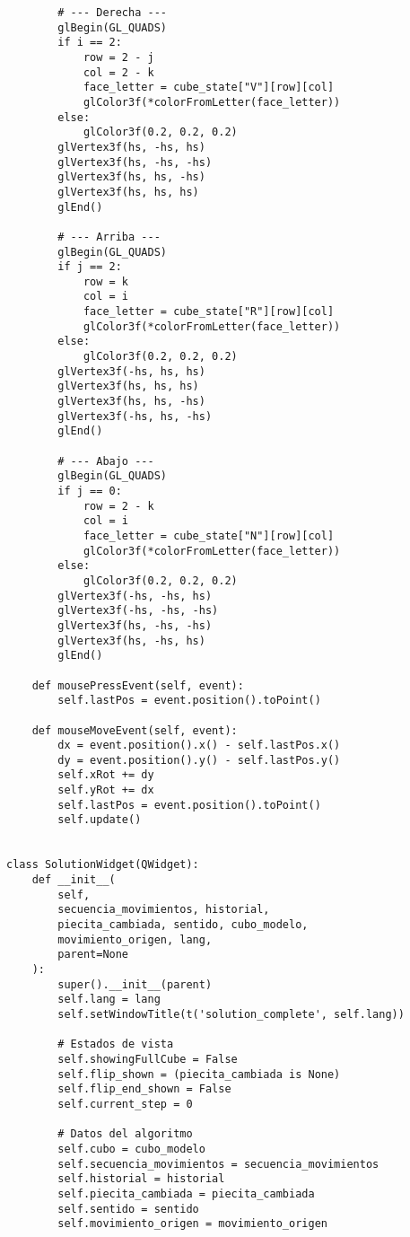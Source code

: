 \begin{lstlisting}
        # --- Derecha ---
        glBegin(GL_QUADS)
        if i == 2:
            row = 2 - j
            col = 2 - k
            face_letter = cube_state["V"][row][col]
            glColor3f(*colorFromLetter(face_letter))
        else:
            glColor3f(0.2, 0.2, 0.2)
        glVertex3f(hs, -hs, hs)
        glVertex3f(hs, -hs, -hs)
        glVertex3f(hs, hs, -hs)
        glVertex3f(hs, hs, hs)
        glEnd()

        # --- Arriba ---
        glBegin(GL_QUADS)
        if j == 2:
            row = k
            col = i
            face_letter = cube_state["R"][row][col]
            glColor3f(*colorFromLetter(face_letter))
        else:
            glColor3f(0.2, 0.2, 0.2)
        glVertex3f(-hs, hs, hs)
        glVertex3f(hs, hs, hs)
        glVertex3f(hs, hs, -hs)
        glVertex3f(-hs, hs, -hs)
        glEnd()

        # --- Abajo ---
        glBegin(GL_QUADS)
        if j == 0:
            row = 2 - k
            col = i
            face_letter = cube_state["N"][row][col]
            glColor3f(*colorFromLetter(face_letter))
        else:
            glColor3f(0.2, 0.2, 0.2)
        glVertex3f(-hs, -hs, hs)
        glVertex3f(-hs, -hs, -hs)
        glVertex3f(hs, -hs, -hs)
        glVertex3f(hs, -hs, hs)
        glEnd()

    def mousePressEvent(self, event):
        self.lastPos = event.position().toPoint()

    def mouseMoveEvent(self, event):
        dx = event.position().x() - self.lastPos.x()
        dy = event.position().y() - self.lastPos.y()
        self.xRot += dy
        self.yRot += dx
        self.lastPos = event.position().toPoint()
        self.update()


class SolutionWidget(QWidget):
    def __init__(
        self,
        secuencia_movimientos, historial,
        piecita_cambiada, sentido, cubo_modelo,
        movimiento_origen, lang,
        parent=None
    ):
        super().__init__(parent)
        self.lang = lang
        self.setWindowTitle(t('solution_complete', self.lang))

        # Estados de vista
        self.showingFullCube = False
        self.flip_shown = (piecita_cambiada is None)
        self.flip_end_shown = False
        self.current_step = 0

        # Datos del algoritmo
        self.cubo = cubo_modelo
        self.secuencia_movimientos = secuencia_movimientos
        self.historial = historial
        self.piecita_cambiada = piecita_cambiada
        self.sentido = sentido
        self.movimiento_origen = movimiento_origen


\end{lstlisting}
